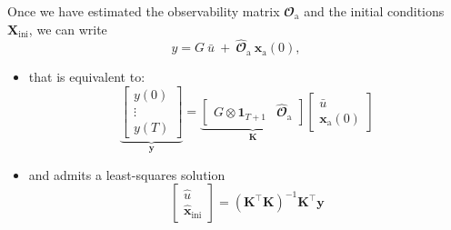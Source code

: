 \documentclass[presentation]{beamer}
\begin{document}
\begin{frame}[label={slide:preliminaries5}]{Once we have estimated the observability matrix $\mathbfcal{O}_\text{a}$ and the initial conditions $\mathbf{X}_\text{ini}$, we can write}
\begin{equation*}  {y} = G \ \bar{{u}} \ + \ \widehat{\mathbfcal{O}}_\text{a} \ \mathbf{x}_\text{a}(0) , \end{equation*}
\begin{itemize}
\item that is equivalent to: 
\begin{equation*}  \underbrace{ \begin{bmatrix}y(0) \\ \vdots \\ y(T) \end{bmatrix}}_{\mathbf{y}} = \underbrace{ \begin{bmatrix} G \otimes \mathbf{1}_{T+1} & \widehat{\mathbfcal{O}}_\text{a} \end{bmatrix}}_{\mathbf{K}} \begin{bmatrix} \bar{{u}} \\ \mathbf{x}_\text{a}(0) \end{bmatrix} \end{equation*}
\item and admits a least-squares solution
\begin{equation*}  \begin{bmatrix} \widehat{{u}} \\ \widehat{\mathbf{x}}_{\text{ini}} \end{bmatrix} = \left( \mathbf{K}^\top \mathbf{K} \right)^{-1} \mathbf{K}^\top \mathbf{y} \end{equation*}
\end{itemize}
\end{frame}
\end{document}
